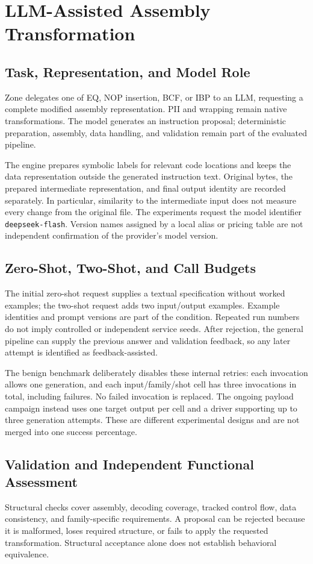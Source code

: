 \section{LLM-Assisted Assembly Transformation}\label{sec:llm}
\subsection{Task, Representation, and Model Role}
Zone delegates one of EQ, NOP insertion, BCF, or IBP to an LLM,
requesting a complete modified assembly representation. PII and
wrapping remain native transformations. The model generates an
instruction proposal; deterministic preparation, assembly, data
handling, and validation remain part of the evaluated pipeline.

The engine prepares symbolic labels for relevant code locations and
keeps the data representation outside the generated instruction text.
Original bytes, the prepared intermediate representation, and final
output identity are recorded separately. In particular, similarity to
the intermediate input does not measure every change from the original
file. The experiments request the model identifier
\texttt{deepseek-flash}. Version names assigned by a local alias or
pricing table are not independent confirmation of the provider's
model version.

\subsection{Zero-Shot, Two-Shot, and Call Budgets}
The initial zero-shot request supplies a textual specification without
worked examples; the two-shot request adds two input/output examples.
Example identities and prompt versions are part of the condition.
Repeated run numbers do not imply controlled or independent service
seeds. After rejection, the general pipeline can supply the previous
answer and validation feedback, so any later attempt is identified
as feedback-assisted.

The benign benchmark deliberately disables these internal retries:
each invocation allows one generation, and each input/family/shot
cell has three invocations in total, including failures. No failed
invocation is replaced. The ongoing payload campaign instead uses
one target output per cell and a driver supporting up to three
generation attempts. These are different experimental designs and
are not merged into one success percentage.

\subsection{Validation and Independent Functional Assessment}
Structural checks cover assembly, decoding coverage, tracked control
flow, data consistency, and family-specific requirements. A proposal
can be rejected because it is malformed, loses required structure,
or fails to apply the requested transformation. Structural acceptance
alone does not establish behavioral equivalence.

